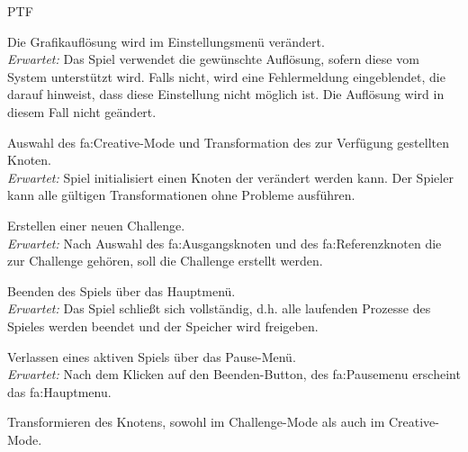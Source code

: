 	\begin{ids}{\gls{PTF}}

		\id[ 10] Die Grafikauflösung wird im Einstellungsmenü verändert.\\
		
		\textit{Erwartet:} Das Spiel verwendet die gewünschte Auflösung, sofern diese vom System unterstützt wird. Falls nicht, wird eine Fehlermeldung eingeblendet, die darauf hinweist, dass diese Einstellung nicht möglich ist. Die Auflösung wird in diesem Fall nicht geändert.

		\id[ 20] Auswahl des \gls{fa:Creative}-Mode und Transformation des zur Verfügung gestellten Knoten.\\
		
		\textit{Erwartet:} Spiel initialisiert einen Knoten der verändert werden kann. Der Spieler kann alle gültigen Transformationen ohne Probleme ausführen.

		\id[ 30] Erstellen einer neuen Challenge.\\
		
		\textit{Erwartet:} Nach Auswahl des \gls{fa:Ausgangsknoten} und des \gls{fa:Referenzknoten} die zur Challenge gehören, soll die Challenge erstellt werden.
		
		
		\id[ 50] Beenden des Spiels über das Hauptmenü.\\
		
		\textit{Erwartet:} Das Spiel schließt sich vollständig, d.h. alle laufenden Prozesse des Spieles werden beendet und der Speicher wird freigeben.

		\id[ 60] Verlassen eines aktiven Spiels über das Pause-Menü.\\
		
		\textit{Erwartet:} Nach dem Klicken auf den Beenden-Button, des \gls{fa:Pausemenu} erscheint das \gls{fa:Hauptmenu}.

		\id[70] Transformieren des Knotens, sowohl im Challenge-Mode als auch im Creative-Mode.\\
		

\end{ids}

